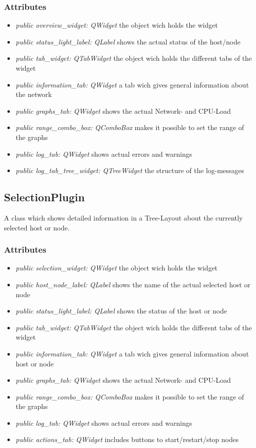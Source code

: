 \subsubsection{Attributes}
\begin{itemize}
  \item \textit{public overview\_widget: QWidget}
  the object wich holds the widget
  \item \textit{public status\_light\_label: QLabel}
  shows the actual status of the host/node
  \item \textit{public tab\_widget: QTabWidget}
  the object wich holds the different tabs of the widget
  \item \textit{public information\_tab: QWidget}
  a tab wich gives general information about the network 
  \item \textit{public graphs\_tab: QWidget}
  shows the actual Network- and CPU-Load
  \item \textit{public range\_combo\_box: QComboBox}
  makes it possible to set the range of the graphs
  \item \textit{public log\_tab: QWidget}
  shows actual errors and warnings
  \item \textit{public log\_tab\_tree\_widget: QTreeWidget}
  the structure of the log-messages  
\end{itemize}

\subsection{SelectionPlugin}
A class which shows detailed information in a Tree-Layout about the currently
selected host or node.
\subsubsection{Attributes}
\begin{itemize}
  \item \textit{public selection\_widget: QWidget}
  the object wich holds the widget
  \item \textit{public host\_node\_label: QLabel}
  shows the name of the actual selected host or node
  \item \textit{public status\_light\_label: QLabel}
  shows the status of the host or node
  \item \textit{public tab\_widget: QTabWidget}
  the object wich holds the different tabs of the widget
  \item \textit{public information\_tab: QWidget}
  a tab wich gives general information about host or node 
  \item \textit{public graphs\_tab: QWidget}
  shows the actual Network- and CPU-Load
  \item \textit{public range\_combo\_box: QComboBox}
  makes it possible to set the range of the graphs
  \item \textit{public log\_tab: QWidget}
  shows actual errors and warnings
  \item \textit{public actions\_tab: QWidget}
  includes buttons to start/restart/stop nodes  
\end{itemize}

